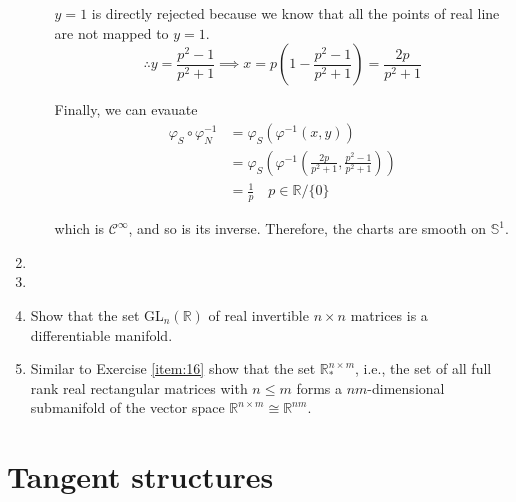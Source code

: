 \documentclass{article}
\begin{document}
\begin{enumerate}[start=13]
\begin{enumerate}
\begin{ans_box}
      $y=1$ is directly rejected because we know that all the points of real line are not mapped to $y=1$.
      \begin{equation*}
        \therefore y=\frac{p^{2}-1}{p^{2}+1}\implies x=p\left(1-\frac{p^{2}-1}{p^{2}+1}\right)=\frac{2p}{p^{2}+1}
      \end{equation*}

      Finally, we can evauate
      \begin{equation*}
        \begin{split}
          \varphi_{S}\circ\varphi^{-1}_{N}&=\varphi_{S}\left(\varphi^{-1}(x,y)\right)\\
          &=\varphi_{S}\left(\varphi^{-1}\left(\frac{2p}{p^{2}+1},\frac{p^{2}-1}{p^{2}+1}\right)\right)\\
          &=\frac{1}{p}\quad p\in\mathbb{R}\slash\{0\}
        \end{split}
      \end{equation*}

      which is $\mathcal{C}^{\infty}$, and so is its inverse. Therefore, the charts are smooth on $\mathbb{S}^{1}$.
    \end{ans_box}

  \end{enumerate}
  \item
  \item
  \item \label{item:16} Show that the set GL$_{n}(\mathbb{R})$ of real invertible $n\times n$ matrices is a differentiable manifold.

  \item Similar to Exercise \ref{item:16} show that the set $\mathbb{R}^{n\times m}_{*}$, i.e., the set of all full rank real rectangular matrices with $n\leq m$ forms a $nm$-dimensional submanifold of the vector space $\mathbb{R}^{n\times m}\cong\mathbb{R}^{nm}$.
\end{enumerate}

\section{Tangent structures}
\end{document}
